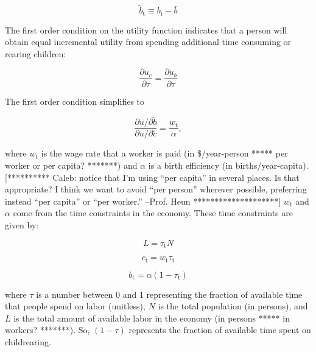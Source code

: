 \documentclass[letterpaper,12pt]{article}
\begin{document}
\begin{equation} \label{eq:b_tilde}
	\tilde b_\mathrm{t} \equiv b_\mathrm{t} - \bar b
\end{equation}

The first order condition on the utility function indicates that a person will obtain equal incremental utility from spending additional time consuming or rearing children:

\begin{equation} \label{eq:first_order_condition_def}
	\frac{\partial u_{c}}{\partial \tau} = \frac{\partial u_{b}}{\partial \tau}
\end{equation}

\noindent The first order condition simplifies to 

\begin{equation} \label{eq:first_order_condition_simplified}
	\frac{\partial u/ \partial\tilde b}{\partial u/ \partial\tilde c} = \frac{w_\mathrm{t}}{\alpha},
\end{equation}

\noindent where $w_\mathrm{t}$ is the wage rate that a worker is paid (in \$/year-person ***** per worker or per capita? *******) and $\alpha$ is a birth efficiency (in births/year-capita). [********** Caleb: notice that I'm using ``per capita'' in several places. Is that appropriate? I think we want to avoid ``per person'' wherever possible, preferring instead ``per capita'' or ``per worker.'' --Prof. Heun ********************] $w_\mathrm{t}$ and $\alpha$ come from the time constraints in the economy. These time constraints are given by:

\begin{equation}\label{eq:pop_work}
	L = \tau_\mathrm{t} N
\end{equation}

\begin{equation} \label{eq:consumption_constraint}
	c_\mathrm{t} = w_\mathrm{t} \tau_\mathrm{t}
\end{equation}

\begin{equation} \label{eq:birth_constraint}
	b_\mathrm{t} = \alpha (1-\tau_\mathrm{t})
\end{equation}

\noindent where $\tau$ is a number between 0 and 1 representing the fraction of available time that people spend on labor (unitless), $N$ is the total population (in persons), and $L$ is the total amount of available labor in the economy (in persons ***** in workers? *******). So, $(1-\tau)$ represents the fraction of available time spent on childrearing.
\end{document}
